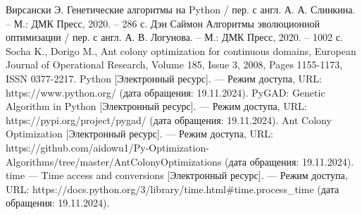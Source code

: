 \begin{thebibliography}{}
	 Вирсански Э. Генетические алгоритмы на Python / пер. с англ. А. А. Слинкина. – М.: ДМК Пресс, 2020. – 286 с.
	 Дэн Саймон Алгоритмы эволюционной оптимизации / пер. с англ. А. В. Логунова. – М.: ДМК Пресс, 2020. – 1002 с.
	 Socha K., Dorigo M., Ant colony optimization for continuous domains, European Journal of Operational Research, Volume 185, Issue 3, 2008, Pages 1155-1173, ISSN 0377-2217.
	 Python [Электронный ресурс]. — Режим доступа, URL: https://www.python.org/ (дата обращения: 19.11.2024).
	 PyGAD: Genetic Algorithm in Python [Электронный ресурс]. — Режим доступа, URL: https://pypi.org/project/pygad/ (дата обращения: 19.11.2024).
	 Ant Colony Optimization [Электронный ресурс]. — Режим доступа, URL: https://github.com/aidowu1/Py-Optimization-Algorithms/tree/master/AntColonyOptimizations (дата обращения: 19.11.2024).
	 time — Time access and conversions [Электронный ресурс]. — Режим доступа, URL: https://docs.python.org/3/library/time.html\#time.process\_time (дата обращения: 19.11.2024).
\end{thebibliography}
